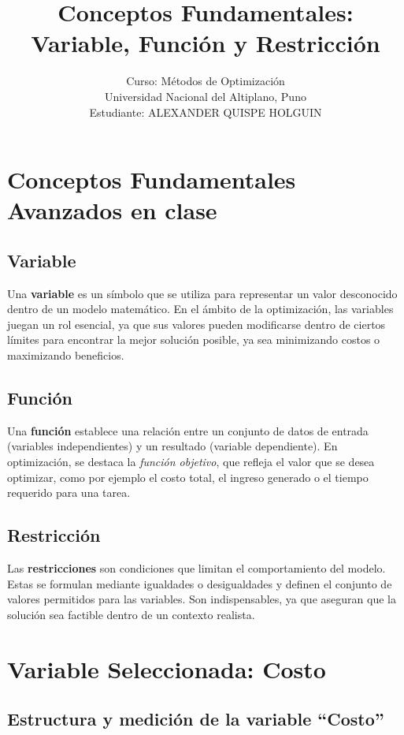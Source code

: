 \documentclass[12pt]{article}
\title{Conceptos Fundamentales: Variable, Función y Restricción}
\author{Curso: Métodos de Optimización \\
	Universidad Nacional del Altiplano, Puno \\
	Estudiante: ALEXANDER QUISPE HOLGUIN}
\begin{document}
	
	\maketitle
	
	\section*{Conceptos Fundamentales Avanzados en clase}
	
	\subsection*{Variable}
	Una \textbf{variable} es un símbolo que se utiliza para representar un valor desconocido dentro de un modelo matemático. En el ámbito de la optimización, las variables juegan un rol esencial, ya que sus valores pueden modificarse dentro de ciertos límites para encontrar la mejor solución posible, ya sea minimizando costos o maximizando beneficios.
	
	\subsection*{Función}
	Una \textbf{función} establece una relación entre un conjunto de datos de entrada (variables independientes) y un resultado (variable dependiente). En optimización, se destaca la \textit{función objetivo}, que refleja el valor que se desea optimizar, como por ejemplo el costo total, el ingreso generado o el tiempo requerido para una tarea.
	
	\subsection*{Restricción}
	Las \textbf{restricciones} son condiciones que limitan el comportamiento del modelo. Estas se formulan mediante igualdades o desigualdades y definen el conjunto de valores permitidos para las variables. Son indispensables, ya que aseguran que la solución sea factible dentro de un contexto realista.
	
	\section*{Variable Seleccionada: Costo}
	
	\subsection*{Estructura y medición de la variable ``Costo''}
	
\end{document}
